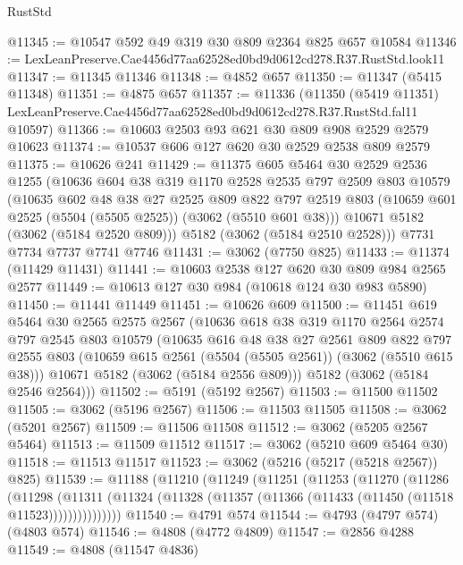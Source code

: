 \begin{lexlean}{RustStd}
\begin{coremodule}
@11345 := @10547 @592 @49 @319 @30 @809 @2364 @825 @657 @10584
@11346 := LexLeanPreserve.Cae4456d77aa62528ed0bd9d0612cd278.R37.RustStd.look11
@11347 := @11345 @11346
@11348 := @4852 @657
@11350 := @11347 (@5415 @11348)
@11351 := @4875 @657
@11357 := @11336
    (@11350
      (@5419 @11351)
      LexLeanPreserve.Cae4456d77aa62528ed0bd9d0612cd278.R37.RustStd.fal11
      @10597)
@11366 := @10603 @2503 @93 @621 @30 @809 @908 @2529 @2579 @10623
@11374 := @10537 @606 @127 @620 @30 @2529 @2538 @809 @2579
@11375 := @10626 @241
@11429 := @11375
    @605
    @5464
    @30
    @2529
    @2536
    @1255
    (@10636
      @604
      @38
      @319
      @1170
      @2528
      @2535
      @797
      @2509
      @803
      @10579
      (@10635
        @602
        @48
        @38
        @27
        @2525
        @809
        @822
        @797
        @2519
        @803
        (@10659 @601 @2525 (@5504 (@5505 @2525)) (@3062 (@5510 @601 @38)))
        @10671
        @5182
        (@3062 (@5184 @2520 @809)))
      @5182
      (@3062 (@5184 @2510 @2528)))
    @7731
    @7734
    @7737
    @7741
    @7746
@11431 := @3062 (@7750 @825)
@11433 := @11374 (@11429 @11431)
@11441 := @10603 @2538 @127 @620 @30 @809 @984 @2565 @2577
@11449 := @10613 @127 @30 @984 (@10618 @124 @30 @983 @5890)
@11450 := @11441 @11449
@11451 := @10626 @609
@11500 := @11451
    @619
    @5464
    @30
    @2565
    @2575
    @2567
    (@10636
      @618
      @38
      @319
      @1170
      @2564
      @2574
      @797
      @2545
      @803
      @10579
      (@10635
        @616
        @48
        @38
        @27
        @2561
        @809
        @822
        @797
        @2555
        @803
        (@10659 @615 @2561 (@5504 (@5505 @2561)) (@3062 (@5510 @615 @38)))
        @10671
        @5182
        (@3062 (@5184 @2556 @809)))
      @5182
      (@3062 (@5184 @2546 @2564)))
@11502 := @5191 (@5192 @2567)
@11503 := @11500 @11502
@11505 := @3062 (@5196 @2567)
@11506 := @11503 @11505
@11508 := @3062 (@5201 @2567)
@11509 := @11506 @11508
@11512 := @3062 (@5205 @2567 @5464)
@11513 := @11509 @11512
@11517 := @3062 (@5210 @609 @5464 @30)
@11518 := @11513 @11517
@11523 := @3062 (@5216 (@5217 (@5218 @2567)) @825)
@11539 := @11188
    (@11210
      (@11249
        (@11251
          (@11253
            (@11270
              (@11286
                (@11298
                  (@11311
                    (@11324 (@11328 (@11357 (@11366 (@11433 (@11450 (@11518 @11523)))))))))))))))
@11540 := @4791 @574
@11544 := @4793 (@4797 @574) (@4803 @574)
@11546 := @4808 (@4772 @4809)
@11547 := @2856 @4288
@11549 := @4808 (@11547 @4836)

\end{coremodule}
\end{lexlean}
